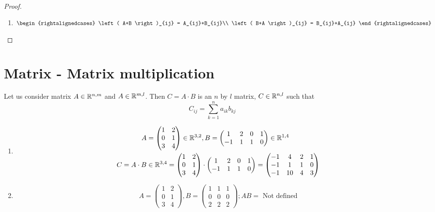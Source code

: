 \begin{proof}
\begin{enumerate}
\item \[
\begin{rightalignedcases}
\left( A+B \right)_{ij} = A_{ij}+B_{ij}\\
\left( B+A \right)_{ij} = B_{ij}+A_{ij}
\end{rightalignedcases}
\]

\end{enumerate}
\end{proof}

\section{Matrix - Matrix multiplication}
\begin{definition}
Let us consider matrix $A\in\mathbb{R}^{n,m}$ and $A\in\mathbb{R}^{m,l}$. Then $C = A\cdot B$ is an $n$ by $l$ matrix, $C\in\mathbb{R}^{n,l}$ such that 
\[
C_{ij} = \sum\limits^{n}_{k=1}a_{ik}b_{kj}
\]
\end{definition}
\begin{example}
\begin{enumerate}
\item \begin{align*}
A&= \begin{pmatrix}
1 & 2\\
0 & 1\\
3 & 4
\end{pmatrix}\in\mathbb{R}^{3,2}, B = \begin{pmatrix}
1 & 2 & 0 & 1\\
-1 & 1 & 1 & 0
\end{pmatrix}\in\mathbb{R}^{1,4}\\
C = A\cdot B&\in\mathbb{R}^{3,4}= \begin{pmatrix}
1 & 2\\
0 & 1\\
3 & 4
\end{pmatrix}\cdot \begin{pmatrix}
1 & 2 & 0 & 1\\
-1 & 1 & 1 & 0
\end{pmatrix} = \begin{pmatrix}
-1 & 4 & 2 & 1\\
-1 & 1 & 1 & 0\\
-1 & 10 & 4 & 3
\end{pmatrix}
\end{align*}
\item 
\[
A = \begin{pmatrix}
1 & 2 \\ 
0 & 1\\
3 & 4
\end{pmatrix}, B = \begin{pmatrix}
1 & 1 & 1\\
0 & 0 & 0\\
2 & 2 & 2
\end{pmatrix}; AB = \text{ Not defined}
\]
\end{enumerate}
\end{example}

